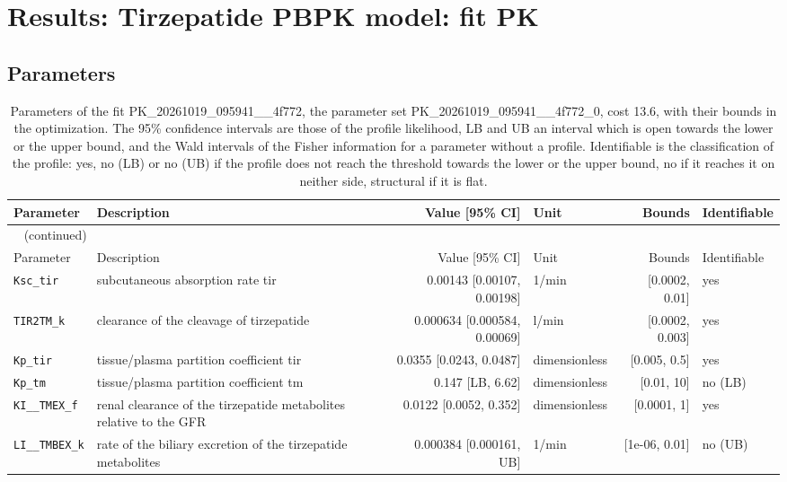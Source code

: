 \section{Results: Tirzepatide PBPK model: fit PK}

\subsection{Parameters}

\begin{longtable}{llrlrl}
\caption{Parameters of the fit PK\_20261019\_095941\_\_4f772, the parameter set PK\_20261019\_095941\_\_4f772\_0, cost 13.6, with their bounds in the optimization. The 95\% confidence intervals are those of the profile likelihood, LB and UB an interval which is open towards the lower or the upper bound, and the Wald intervals of the Fisher information for a parameter without a profile. Identifiable is the classification of the profile: yes, no (LB) or no (UB) if the profile does not reach the threshold towards the lower or the upper bound, no if it reaches it on neither side, structural if it is flat.}\label{tab:parameters:PK_20261019_095941__4f772} \\
\toprule
Parameter & Description & Value [95\% CI] & Unit & Bounds & Identifiable \\
\midrule
\endfirsthead
\multicolumn{6}{l}{\small\tablename~\thetable{} (continued)} \\
\toprule
Parameter & Description & Value [95\% CI] & Unit & Bounds & Identifiable \\
\midrule
\endhead
\bottomrule
\endlastfoot
\texttt{Ksc\_tir} & subcutaneous absorption rate tir & 0.00143 [0.00107, 0.00198] & 1/min & [0.0002, 0.01] & yes \\
\texttt{TIR2TM\_k} & clearance of the cleavage of tirzepatide & 0.000634 [0.000584, 0.00069] & l/min & [0.0002, 0.003] & yes \\
\texttt{Kp\_tir} & tissue/plasma partition coefficient tir & 0.0355 [0.0243, 0.0487] & dimensionless & [0.005, 0.5] & yes \\
\texttt{Kp\_tm} & tissue/plasma partition coefficient tm & 0.147 [LB, 6.62] & dimensionless & [0.01, 10] & no (LB) \\
\texttt{KI\_\_TMEX\_f} & renal clearance of the tirzepatide metabolites relative to the GFR & 0.0122 [0.0052, 0.352] & dimensionless & [0.0001, 1] & yes \\
\texttt{LI\_\_TMBEX\_k} & rate of the biliary excretion of the tirzepatide metabolites & 0.000384 [0.000161, UB] & 1/min & [1e-06, 0.01] & no (UB) \\
\end{longtable}

